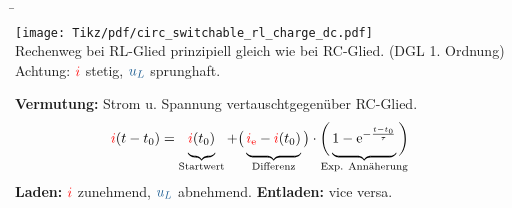 \begin{frame}[t]
\b{%
\begin{minipage}{\textwidth}\centering%
\begin{minipage}[t][][t]{0.48\textwidth}\centering\vspace{0cm}%
    \texttt{[image: Tikz/pdf/circ\_switchable\_rl\_charge\_dc.pdf]}\\[1em]%
    {\flushleft%
    Rechenweg bei RL-Glied prinzipiell gleich wie bei RC-Glied. (DGL 1. Ordnung) \\
    Achtung: ${\color{red}i}$ stetig, $\ecv{u_L}$ sprunghaft.%
    }%
\end{minipage}
\begin{minipage}[t][][t]{0.48\textwidth}\centering\vspace{0cm}%
\end{minipage}
\end{minipage}\hfill%
\begin{minipage}{\textwidth}%
\textbf{Vermutung:} Strom u. Spannung \glqq vertauscht\grqq gegenüber RC-Glied.
\begin{align*}
    \eci{i}(t-t_0) &= \underbrace{\eci{i}(t_0) \vphantom{\Big|}}_{\text{Startwert}} + \big(\underbrace{\eci{i_{\mathrm{e}}} - \eci{i}(t_0) \vphantom{\Big|}}_{\text{Differenz}}\big) \cdot \bigg( \underbrace{ 1- \mathrm{e}^{-\frac{t-t_0}{\tau}} \vphantom{\Big|}}_{\text{\clap{Exp. Annäherung}}} \bigg)
\end{align*}
\textbf{Laden:} ${\color{red}i}$ zunehmend, $\ecv{u_L}$ abnehmend. \quad \textbf{Entladen:} vice versa.
\end{minipage}
}%
\end{frame}


